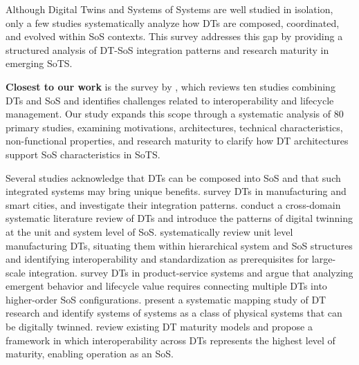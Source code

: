 Although Digital Twins \cite{barricelli2019survey,kritzinger2018digital,tao2018digital,fuller2020digital,negri2017review,ferko2022architecting,ferko2023standardisation} and Systems of Systems \cite{keating2003system,gorod2008system,nielsen2015systems,uday2015designing,klein2013systematic,axelsson2015systematic,dridi2020system,santos2022evaluation,vargas2016approaches} are well studied in isolation, only a few studies systematically analyze how DTs are composed, coordinated, and evolved within SoS contexts. This survey addresses this gap by providing a structured analysis of DT-SoS integration patterns and research maturity in emerging SoTS.


\textbf{Closest to our work} is the survey by \textcite{olsson2023systems}, which reviews ten studies combining DTs and SoS and identifies challenges related to interoperability and lifecycle management. Our study expands this scope through a systematic analysis of 80 primary studies, examining motivations, architectures, technical characteristics, non-functional properties, and research maturity to clarify how DT architectures support SoS characteristics in SoTS.

Several studies acknowledge that DTs can be composed into SoS and that such integrated systems may bring unique benefits. \textcite{mylonas2021digital} survey DTs in manufacturing and smart cities, and investigate their integration patterns. \textcite{semeraro2021digital} conduct a cross-domain systematic literature review of DTs and introduce the patterns of digital twinning at the unit and system level of SoS. \textcite{bottjer2023review} systematically review unit level manufacturing DTs, situating them within hierarchical system and SoS structures and identifying interoperability and standardization as prerequisites for large-scale integration. \textcite{bertoni2022designing} survey DTs in product-service systems and argue that analyzing emergent behavior and lifecycle value requires connecting multiple DTs into higher-order SoS configurations. \textcite{dalibor2022cross} present a systematic mapping study of DT research and identify systems of systems as a class of physical systems that can be digitally twinned. \textcite{klar2023digital} review existing DT maturity models and propose a framework in which interoperability across DTs represents the highest level of maturity, enabling operation as an SoS.

